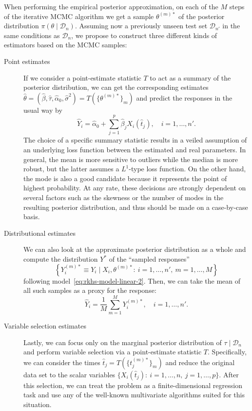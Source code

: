 \documentclass[ba]{imsart}
\numberwithin{equation}{section}
\theoremstyle{plain}
\begin{document}
When performing the empirical posterior approximation, on each of the \(M\) steps of the iterative MCMC algorithm we get a sample \(\theta^{(m)*}\) of the posterior distribution \(\pi(\theta\mid \mathcal D_n)\). Assuming now a previously unseen test set \(\mathcal D_{n'}\) in the same conditions as \(\mathcal D_n\), we propose to construct three different kinds of estimators based on the MCMC samples:

\begin{description}
  \item[Point estimates] If we consider a point-estimate statistic \(T\) to act as a summary of the posterior distribution, we can get the corresponding estimates \(\hat{\theta}=(\hat \beta, \hat \tau, \hat{\alpha}_0, \hat{\sigma}^2) = T(\{\theta^{(m)*}\}_m)\) and predict the responses in the usual way by
  \[
    \hat Y_i = \hat{\alpha}_0 + \sum_{j=1}^p \hat{\beta}_j X_i(\hat{t}_j), \quad i=1,\dots, n'.
  \]
  The choice of a specific summary statistic results in a veiled assumption of an underlying loss function between the estimated and real parameters. In general, the mean is more sensitive to outliers while the median is more robust, but the latter assumes a \(L^1\)-type loss function. On the other hand, the mode is also a good candidate because it represents the point of highest probability. At any rate, these decisions are strongly dependent on several factors such as the skewness or the number of modes in the resulting posterior distribution, and thus should be made on a case-by-case basis.
  \item[Distributional estimates] We can also look at the approximate posterior distribution as a whole and compute the distribution \(Y^*\) of the ``sampled responses''
  \[
  \left\{Y_i^{(m)*} \equiv Y_i \mid X_i, \theta^{(m)*}:\ i=1,\dots,n', \ m=1,\dots,M\right\}
  \]
  following model~\eqref{eq:rkhs-model-linear-2}. Then, we can take the mean of all such samples as a proxy for the response:
  \[
  \hat Y_i = \frac{1}{M}\sum_{m=1}^M Y_i^{(m)*}, \quad i=1,\dots,n'.
  \]
  \item[Variable selection estimates] Lastly, we can focus only on the marginal posterior distribution of \(\tau\mid\mathcal D_n\) and perform variable selection via a point-estimate statistic \(T\). Specifically, we can consider the times \(\hat t_j = T(\{t_j^{(m)*}\}_m)\) and reduce the original data set to the scalar variables \(\{X_i(\hat t_j):\ i=1, \dots,n, \ j=1,\dots,p\}\). After this selection, we can treat the problem as a finite-dimensional regression task and use any of the well-known multivariate algorithms suited for this situation.
\end{description}
\end{document}
